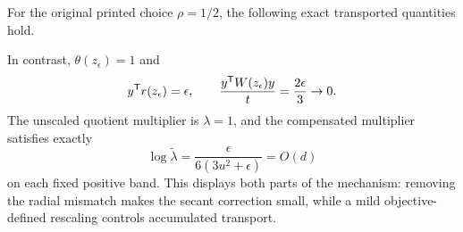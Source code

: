 For the original printed choice $\rho=1/2$, the following exact transported quantities hold.

In contrast, $\theta(z_\epsilon)=1$ and
\[
 y^{\mathsf T} r(z_\epsilon)=\epsilon,\qquad
 \frac{y^{\mathsf T} W(z_\epsilon)y}{t}=\frac{2\epsilon}{3}\to0.
\]
The unscaled quotient multiplier is $\lambda=1$, and the compensated multiplier satisfies exactly
\[
 \log\widetilde\lambda
 =\frac{\epsilon}{6(3u^2+\epsilon)}=O(d)
\]
on each fixed positive band. This displays both parts of the mechanism: removing the radial mismatch makes the secant correction small, while a mild objective-defined rescaling controls accumulated transport.


\endgroup
